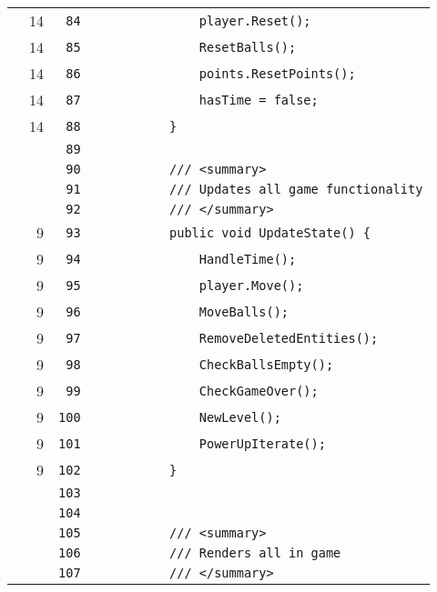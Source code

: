 \documentclass[a4paper,landscape,10pt]{article}
\begin{document}
\begin{longtable}[l]{lrrll}
\cellcolor{green} & 14 & \verb~84~ & & \verb~            player.Reset();~\\
\cellcolor{green} & 14 & \verb~85~ & & \verb~            ResetBalls();~\\
\cellcolor{green} & 14 & \verb~86~ & & \verb~            points.ResetPoints();~\\
\cellcolor{green} & 14 & \verb~87~ & & \verb~            hasTime = false;~\\
\cellcolor{green} & 14 & \verb~88~ & & \verb~        }~\\
\cellcolor{gray} &  & \verb~89~ & & \verb~~\\
\cellcolor{gray} &  & \verb~90~ & & \verb~        /// <summary>~\\
\cellcolor{gray} &  & \verb~91~ & & \verb~        /// Updates all game functionality~\\
\cellcolor{gray} &  & \verb~92~ & & \verb~        /// </summary>~\\
\cellcolor{green} & 9 & \verb~93~ & & \verb~        public void UpdateState() {~\\
\cellcolor{green} & 9 & \verb~94~ & & \verb~            HandleTime();~\\
\cellcolor{green} & 9 & \verb~95~ & & \verb~            player.Move();~\\
\cellcolor{green} & 9 & \verb~96~ & & \verb~            MoveBalls();~\\
\cellcolor{green} & 9 & \verb~97~ & & \verb~            RemoveDeletedEntities();~\\
\cellcolor{green} & 9 & \verb~98~ & & \verb~            CheckBallsEmpty();~\\
\cellcolor{green} & 9 & \verb~99~ & & \verb~            CheckGameOver();~\\
\cellcolor{green} & 9 & \verb~100~ & & \verb~            NewLevel();~\\
\cellcolor{green} & 9 & \verb~101~ & & \verb~            PowerUpIterate();~\\
\cellcolor{green} & 9 & \verb~102~ & & \verb~        }~\\
\cellcolor{gray} &  & \verb~103~ & & \verb~~\\
\cellcolor{gray} &  & \verb~104~ & & \verb~~\\
\cellcolor{gray} &  & \verb~105~ & & \verb~        /// <summary>~\\
\cellcolor{gray} &  & \verb~106~ & & \verb~        /// Renders all in game~\\
\cellcolor{gray} &  & \verb~107~ & & \verb~        /// </summary>~\\

\end{longtable}
\end{document}
